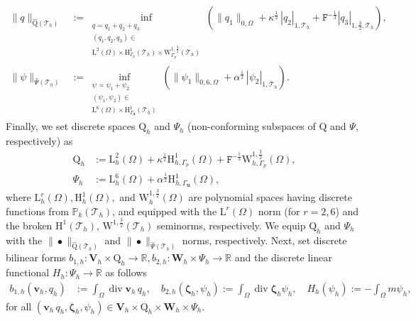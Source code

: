 \documentclass[11pt, reqno, a4paper, twoside]{article}
\newcommand{\bu}{\boldsymbol{u}}
\newcommand{\bv}{\boldsymbol{v}}
\newcommand\bzeta{\boldsymbol{\zeta}}
\newcommand{\rF}{\mathtt{F}}
\newcommand{\rH}{\mathrm{H}}
\newcommand{\rL}{\mathrm{L}}
\newcommand{\rW}{\mathrm{W}}
\newcommand{\rQ}{\mathrm{Q}}
\newcommand{\bW}{\mathbf{W}}
\newcommand{\bV}{\mathbf{V}}
\newcommand{\cT}{\mathcal{T}}
\newcommand\vdiv{\mathop{\mathrm{div}}\nolimits}
\numberwithin{equation}{section}
\numberwithin{remark}{section}
\numberwithin{figure}{section}
\numberwithin{table}{section}
\begin{document}
{{\begin{align}
\|q\|_{{\widehat{\rQ}(\cT_h)}}&:= 
\inf_{\substack{
    q = q_{1} + q_{2} + q_{3} \\
    (q_{1},q_{2},q_{3}) \in \\ \rL^2(\Omega)
     \times\rH_{\Gamma_p}^1(\mathcal{T}_h)
    \times \rW_{\Gamma_p}^{1,\frac32}(\mathcal{T}_h)
}}
\left(
    \|q_{1}\|_{0,\Omega} 
    +\kappa^{\frac12}\, |q_{2}|_{1,\mathcal{T}_h} 
    + \rF^{-\frac13} |q_{3}|_{1,\frac32,\mathcal{T}_h}
\right),\label{norm:Q.hat}\\
\|\psi\|_{\widehat{\Psi}(\cT_h)}&:=\inf_{\substack{
    \psi = \psi_{1} + \psi_{2} \\
    (\psi_{1},\psi_{2}) \in \\ \rL^6(\Omega)
     \times\rH_{\Gamma_{\bu}}^1(\mathcal{T}_h)
}}
\left(
    \|\psi_{1}\|_{0,6,\Omega} 
    +\alpha^{\frac12}\, |\psi_{2}|_{1,\mathcal{T}_h}  
\right).\label{norm:Psi.hat}
\end{align}
Finally, we set  discrete spaces \(\rQ_h\) and \(\Psi_h\) (non-conforming subspaces of   \(\rQ\) and \(\Psi\),  respectively) as    
\begin{subequations}
\begin{align}
\rQ_h &:=  \rL_h^2(\Omega) +\kappa^{\frac12} \rH^1_{h,{\Gamma_p}}(\Omega)+\rF^{-\frac13}\rW^{1,\frac32}_{h,\Gamma_p}(\Omega),\label{eq:disc.Ph}\\
\Psi_h&:=\rL^6_h(\Omega)+\alpha^{\frac12}\rH^1_{h,\Gamma_{\bu}}(\Omega),\label{eq:disc.Psih}
\end{align}
\end{subequations}
where \( \rL_h^r(\Omega), \rH^1_h(\Omega), \) and \(\rW^{1,\frac32}_h(\Omega)\) are polynomial spaces having discrete functions from  \( {\mathbb{P}_k(\cT_h)} \), and equipped with the \( \rL^r(\Omega)\) norm (for \(r=2,6\))  and the broken \(\rH^1(\cT_h),\,\rW^{1,\frac32}(\cT_h)\) seminorms, respectively. 
We equip \(\rQ_h\) and \(\Psi_h\) with the $\|\bullet\|_{\widehat{\rQ}(\cT_h)}$ and $\|\bullet\|_{\widehat{\Psi}(\cT_h)}$ norms, respectively. 
Next, set discrete bilinear forms  
$b_{1,h}: \bV_h\times \rQ_h \to \mathbb{R}, b_{2,h}: \bW_h\times \Psi_h \to \mathbb{R}$ 
 and the discrete linear functional \(H_h:\Psi_h\to\mathbb{R}\) as follows
\begin{align*}
b_{1,h}(\bv_h,q_h)&:=\int_{\Omega}\vdiv\bv_h\,q_h,\quad
b_{2,h}(\bzeta_h,\psi_h):=\int_{\Omega}\vdiv\bzeta_h\psi_h, \quad H_h(\psi_h):=-\int_{\Omega}m\psi_h, 
\end{align*}
for all \( (\bv_h\,  q_h, \bzeta_h,\psi_h)\in \bV_h\times {\rQ_h} \times \bW_h\times\Psi_h.\)
}}
\end{document}
